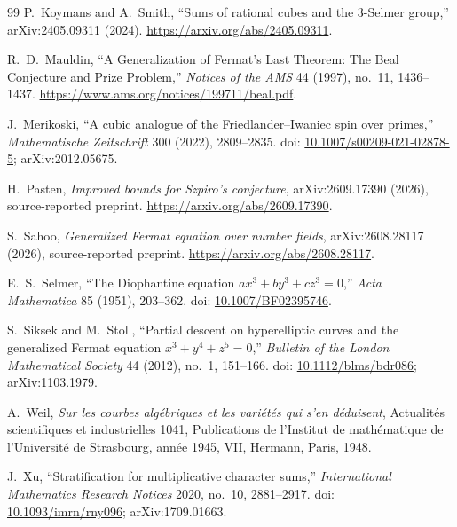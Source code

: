 \documentclass[11pt,a4paper]{article}
\begin{document}
\begin{thebibliography}{99}
P.~Koymans and A.~Smith, ``Sums of rational cubes and the $3$-Selmer
group,'' arXiv:2405.09311 (2024).
\url{https://arxiv.org/abs/2405.09311}.

R.~D.~Mauldin, ``A Generalization of Fermat's Last Theorem: The Beal
Conjecture and Prize Problem,''
\emph{Notices of the AMS} 44 (1997), no.\ 11, 1436--1437.
\url{https://www.ams.org/notices/199711/beal.pdf}.

J.~Merikoski, ``A cubic analogue of the Friedlander--Iwaniec spin over
primes,'' \emph{Mathematische Zeitschrift} 300 (2022), 2809--2835.
doi: \href{https://doi.org/10.1007/s00209-021-02878-5}{10.1007/s00209-021-02878-5};
arXiv:2012.05675.

H.~Pasten, \emph{Improved bounds for Szpiro's conjecture},
arXiv:2609.17390 (2026), source-reported preprint.
\url{https://arxiv.org/abs/2609.17390}.

S.~Sahoo, \emph{Generalized Fermat equation over number fields},
arXiv:2608.28117 (2026), source-reported preprint.
\url{https://arxiv.org/abs/2608.28117}.

E.~S.~Selmer, ``The Diophantine equation $ax^3+by^3+cz^3=0$,''
\emph{Acta Mathematica} 85 (1951), 203--362. doi:
\href{https://doi.org/10.1007/BF02395746}{10.1007/BF02395746}.

S.~Siksek and M.~Stoll, ``Partial descent on hyperelliptic curves
and the generalized Fermat equation $x^3+y^4+z^5=0$,''
\emph{Bulletin of the London Mathematical Society} 44 (2012),
no.\ 1, 151--166. doi:
\href{https://doi.org/10.1112/blms/bdr086}{10.1112/blms/bdr086};
arXiv:1103.1979.

A.~Weil, \emph{Sur les courbes alg\'ebriques et les vari\'et\'es qui
s'en d\'eduisent}, Actualit\'es scientifiques et industrielles 1041,
Publications de l'Institut de math\'ematique de l'Universit\'e de
Strasbourg, ann\'ee 1945, VII, Hermann, Paris, 1948.

J.~Xu, ``Stratification for multiplicative character sums,''
\emph{International Mathematics Research Notices} 2020, no.\ 10,
2881--2917. doi:
\href{https://doi.org/10.1093/imrn/rny096}{10.1093/imrn/rny096};
arXiv:1709.01663.

\end{thebibliography}
\endgroup
\end{document}

